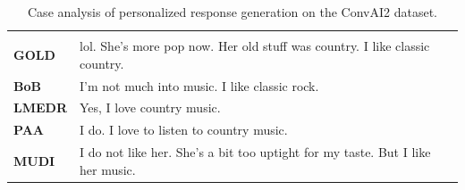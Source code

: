 \begin{table}[ht]
\begin{tabular}{|l|p{11cm}|}
\hhline{|==|}
\rowcolor[RGB]{204,217,245}
\multicolumn{2}{|c|}{\textbf{Response}} \\
\hhline{|==|}
\textbf{GOLD} & lol. She's more pop now. Her old stuff was country. I like classic country. \\
\textbf{BoB} & I'm not much into music. I like classic rock. \\
\textbf{LMEDR} & Yes, I love country music. \\
\textbf{PAA} & I do. I love to listen to country music. \\
\textbf{MUDI} & I do not like her. She's a bit too uptight for my taste. But I like her music. \\

\hline
\end{tabular}
\caption{Case analysis of personalized response generation on the ConvAI2 dataset.}
\label{table:case_study_4}
\end{table}

\EndChapter
